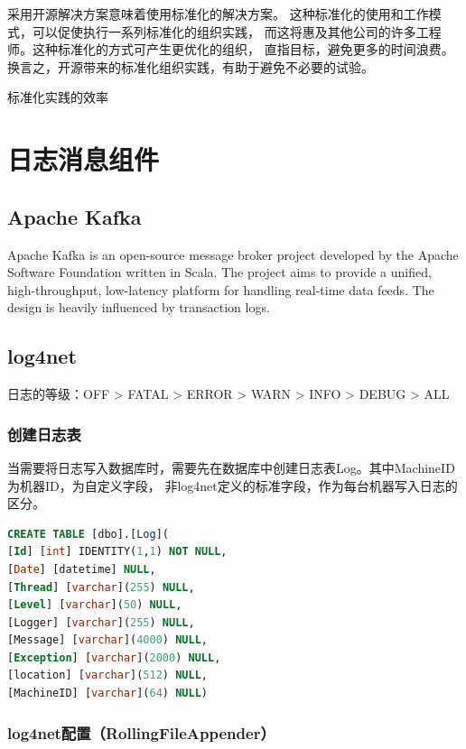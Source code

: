 \documentclass{book}
\begin{document}
\epigraph{采用开源解决方案意味着使用标准化的解决方案。
这种标准化的使用和工作模式，可以促使执行一系列标准化的组织实践，
而这将惠及其他公司的许多工程师。这种标准化的方式可产生更优化的组织，
直指目标，避免更多的时间浪费。换言之，开源带来的标准化组织实践，有助于避免不必要的试验。}{标准化实践的效率}

\clearpage
\mbox{}
\clearpage

\chapter{日志消息组件}

\clearpage

\section{Apache Kafka}

Apache Kafka is an open-source message broker project 
developed by the Apache Software Foundation written in Scala. 
The project aims to provide a unified, high-throughput, 
low-latency platform for handling real-time data feeds. 
The design is heavily influenced by transaction logs.

\section{log4net}

日志的等级：OFF > FATAL > ERROR > WARN > INFO > DEBUG  > ALL

\subsection{创建日志表}

当需要将日志写入数据库时，需要先在数据库中创建日志表Log。其中MachineID为机器ID，为自定义字段，
非log4net定义的标准字段，作为每台机器写入日志的区分。

\begin{lstlisting}[language=SQL]
CREATE TABLE [dbo].[Log](	
[Id] [int] IDENTITY(1,1) NOT NULL,
[Date] [datetime] NULL,
[Thread] [varchar](255) NULL,	
[Level] [varchar](50) NULL,	
[Logger] [varchar](255) NULL,
[Message] [varchar](4000) NULL,	
[Exception] [varchar](2000) NULL,	
[location] [varchar](512) NULL,
[MachineID] [varchar](64) NULL)
\end{lstlisting}

\subsection{log4net配置（RollingFileAppender）}
\end{document}
